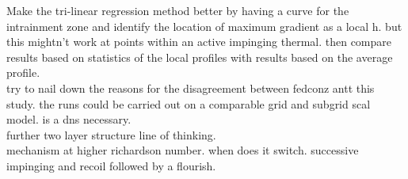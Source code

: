 Make the tri-linear regression method better by having a curve for the intrainment zone and identify the location of maximum gradient as a local h.  but this mightn't work at points within an active impinging thermal.  then compare results based on statistics of the local profiles with results based on the average profile.\\

try to nail down the reasons for the disagreement between fedconz antt this study.  the runs could be carried out on a comparable grid and subgrid scal model. is a dns necessary. \\

further two layer structure line of thinking.\\

mechanism at higher richardson number. when does it switch.  successive impinging and recoil followed by a flourish.\\

\FloatBarrier


\endinput

Any text after an \endinput is ignored.
You could put scraps here or things in progress.
